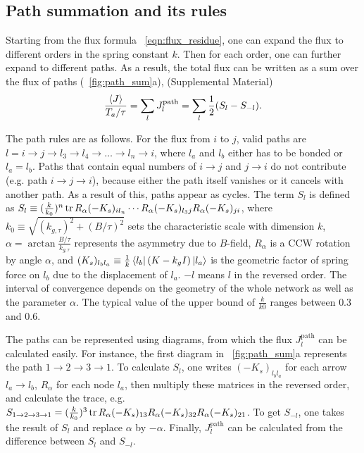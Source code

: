 \documentclass[
 preprint,
 preprintnumbers,
 amsmath,amssymb,
 aps,
 pre,
 longbibliography,
 superscriptaddress,
 10pt, twocolumn
]{revtex4-1}
\begin{document}

\subsection{Path summation and its rules}
Starting from the flux formula \eqnname~\eqref{eqn:flux_residue}, one can expand the flux to different orders in the spring constant $k$. Then for each order, one can further expand to different paths.
As a result, the total flux can be written as a sum over the flux of paths (\figurename~\ref{fig:path_sum}a), (Supplemental Material)
\begin{equation} \label{eqn:flux_path}
    \frac{\expval{J}}{T_a/\tau} = \sum_l J^\text{path}_l = \sum_l \frac{1}{2}(S_l - S_{-l}).
\end{equation}

The path rules are as follows.
For the flux from $i$ to $j$, valid paths are $l=i\rightarrow j\rightarrow l_3\rightarrow l_4\rightarrow \dots \rightarrow l_n\rightarrow i$, where $l_a$ and $l_b$ either has to be bonded or $l_a=l_b$. Paths that contain equal numbers of $i\rightarrow j$ and $j\rightarrow i$ do not contribute (e.g. path $i\rightarrow j\rightarrow i$), because either the path itself vanishes or it cancels with another path. As a result of this, paths appear as cycles.
The term $S_l$ is defined as $S_l \equiv (\frac{k}{k_0})^n \tr R_\alpha (-K_s)_{i l_n} \cdots R_\alpha (-K_s)_{l_3j} R_\alpha (-K_s)_{ji}$,
where $k_0\equiv \sqrt{(k_{g,\tau})^2 + (B/\tau)^2}$ sets the characteristic scale with dimension $k$, $\alpha = \arctan{\frac{B/\tau}{k_{g,\tau}}}$ represents the asymmetry due to $B$-field, $R_\alpha$ is a CCW rotation by angle $\alpha$, and $(K_s)_{l_b l_a} \equiv \frac{1}{k}\bra{l_b}(K-k_gI)\ket{l_a}$ is the geometric factor of spring force on $l_b$ due to the displacement of $l_a$.
$-l$ means $l$ in the reversed order.
The interval of convergence depends on the geometry of the whole network as well as the parameter $\alpha$. The typical value of the upper bound of $\frac{k}{k0}$ ranges between $0.3$ and $0.6$.

The paths can be represented using diagrams, from which the flux $J^\text{path}_l$ can be calculated easily. For instance, the first diagram in \figurename~\ref{fig:path_sum}a represents the path $1\rightarrow 2\rightarrow 3\rightarrow 1$. To calculate $S_l$, one writes $(-K_s)_{l_bl_a}$ for each arrow $l_a\rightarrow l_b$, $R_\alpha$ for each node $l_a$, then multiply these matrices in the reversed order, and calculate the trace, e.g. $S_{1\rightarrow 2\rightarrow 3\rightarrow 1} = (\frac{k}{k_0})^3 \tr R_\alpha (-K_s)_{13} R_\alpha (-K_s)_{32} R_\alpha (-K_s)_{21}$. To get $S_{-l}$, one takes the result of $S_l$ and replace $\alpha$ by $-\alpha$. Finally, $J^\text{path}_l$ can be calculated from the difference between $S_l$ and $S_{-l}$.
\end{document}

